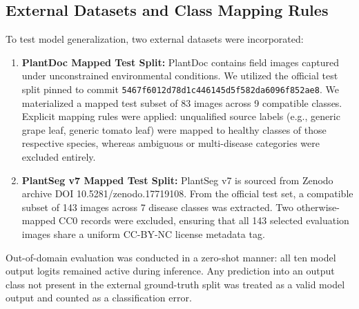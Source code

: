 \documentclass[10pt,journal,compsoc]{IEEEtran}
\begin{document}
\subsection{External Datasets and Class Mapping Rules}
To test model generalization, two external datasets were incorporated:
\begin{enumerate}
    \item \textbf{PlantDoc Mapped Test Split:} PlantDoc \cite{singh2020} contains field images captured under unconstrained environmental conditions. We utilized the official test split pinned to commit \texttt{5467f6012d78d1c446145d5f582da6096f852ae8}. We materialized a mapped test subset of 83 images across 9 compatible classes. Explicit mapping rules were applied: unqualified source labels (e.g., generic grape leaf, generic tomato leaf) were mapped to healthy classes of those respective species, whereas ambiguous or multi-disease categories were excluded entirely.
    \item \textbf{PlantSeg v7 Mapped Test Split:} PlantSeg v7 \cite{aitmagdalene2024} is sourced from Zenodo archive DOI 10.5281/zenodo.17719108. From the official test set, a compatible subset of 143 images across 7 disease classes was extracted. Two otherwise-mapped CC0 records were excluded, ensuring that all 143 selected evaluation images share a uniform CC-BY-NC license metadata tag.
\end{enumerate}

Out-of-domain evaluation was conducted in a zero-shot manner: all ten model output logits remained active during inference. Any prediction into an output class not present in the external ground-truth split was treated as a valid model output and counted as a classification error.
\end{document}
